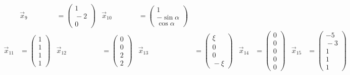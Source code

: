 \documentclass[11pt]{exam}
\begin{document}
\begin{questions}
\begin{align*}
	&\vec{x}_9&=\left(\begin{array}{c}1\\{}-2\\0\end{array}\right)
	&\vec{x}_{10}&=\left(\begin{array}{c}1\\-\sin\alpha\\{}\cos\alpha\end{array}\right)\\
	\vec{x}_{11}&=\left(\begin{array}{c}1\\1\\1\\1\end{array}\right)
	&\vec{x}_{12}&=\left(\begin{array}{c}0\\0\\2\\2\end{array}\right)
	&\vec{x}_{13}&=\left(\begin{array}{c}\xi\\0\\0\\{}-\xi\end{array}\right)
	&\vec{x}_{14}&=\left(\begin{array}{c}0\\0\\0\\0\\0\end{array}\right)
	&\vec{x}_{15}&=\left(\begin{array}{c}-5\\{}-3\\1\\1\\1\end{array}\right)
\end{align*}


\end{questions}
\end{document}
